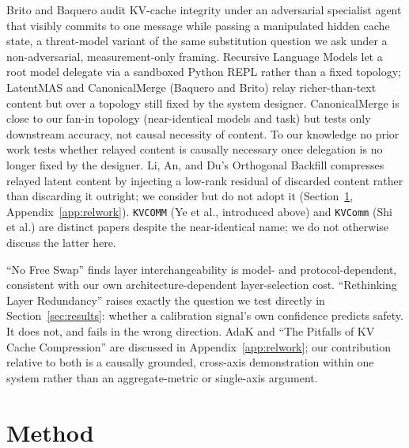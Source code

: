 \documentclass[11pt]{article}
\begin{document}
Brito and Baquero \citep{latentagentslie2026} audit KV-cache integrity
under an adversarial specialist agent that visibly commits to one
message while passing a manipulated hidden cache state, a threat-model
variant of the same substitution question we ask under a
non-adversarial, measurement-only framing. Recursive Language Models
\citep{rlm2026} let a root model delegate via a sandboxed Python REPL
rather than a fixed topology; LatentMAS \citep{latentmas2026} and
CanonicalMerge \citep{canonicalmerge2026} (Baquero and Brito) relay
richer-than-text content but over a topology still fixed by the system
designer. CanonicalMerge is close to our fan-in topology (near-identical
models and task) but tests only downstream accuracy, not causal
necessity of content. To our knowledge no prior work tests whether
relayed content is causally necessary once delegation is no longer
fixed by the designer. Li, An, and Du's Orthogonal Backfill
\citep{orthobackfill2026} compresses relayed latent content by
injecting a low-rank residual of discarded content rather than
discarding it outright; we consider but do not adopt it
(Section~\ref{sec:method}, Appendix~\ref{app:relwork}). \texttt{KVCOMM}
\citep{kvcomm2025} (Ye et al., introduced above) and \texttt{KVComm}
\citep{shikvcomm2025} (Shi et al.) are distinct papers despite the
near-identical name; we do not otherwise discuss the latter here.

``No Free Swap'' \citep{nofreeswap2026} finds layer interchangeability
is model- and protocol-dependent, consistent with our own
architecture-dependent layer-selection cost. ``Rethinking Layer
Redundancy'' \citep{rethinkredundancy2026} raises exactly the question
we test directly in Section~\ref{sec:results}: whether a calibration
signal's own confidence predicts safety. It does not, and fails in the
wrong direction. AdaK \citep{adak2026} and ``The Pitfalls of KV Cache
Compression'' \citep{pitfallskv2026} are discussed in
Appendix~\ref{app:relwork}; our contribution relative to both is a
causally grounded, cross-axis demonstration within one system rather
than an aggregate-metric or single-axis argument.

\section{Method}
\label{sec:method}
\end{document}
